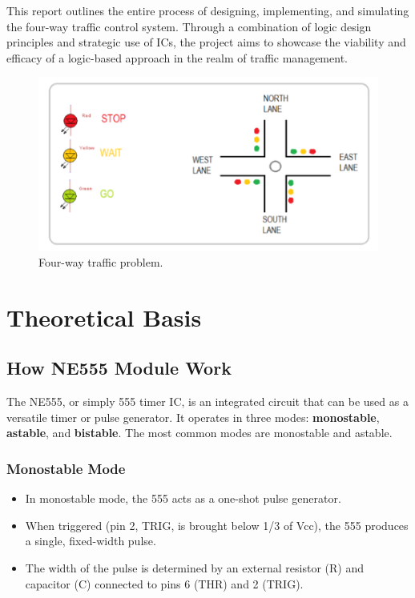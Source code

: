 \documentclass{article}
\begin{document}
This report outlines the entire process of designing, implementing, and simulating the four-way traffic control system. Through a combination of logic design principles and strategic use of ICs, the project aims to showcase the viability and efficacy of a logic-based approach in the realm of traffic management.

\begin{figure}[h]
    \centering
    \includegraphics[width=12cm]{Pic/Pictures/4 ways.png}
    \caption{Four-way traffic problem.}
    \label{fig:enter-label}
\end{figure}
\newpage

\section{Theoretical Basis}
\subsection{How NE555 Module Work}
The NE555, or simply 555 timer IC, is an integrated circuit that can be used as a versatile timer or pulse generator. It operates in three modes: \textbf{monostable}, \textbf{astable}, and \textbf{bistable}. The most common modes are monostable and astable.\par
\subsubsection{Monostable Mode}\par
\begin{itemize}
    \item In monostable mode, the 555 acts as a one-shot pulse generator.
    \item When triggered (pin 2, TRIG, is brought below 1/3 of Vcc), the 555 produces a single, fixed-width pulse.
    \item The width of the pulse is determined by an external resistor (R) and capacitor (C) connected to pins 6 (THR) and 2 (TRIG).
\end{itemize}
\end{document}
